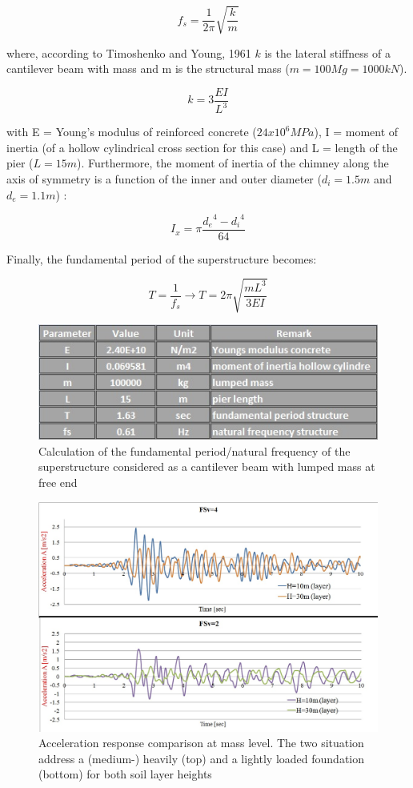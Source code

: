 \begin{equation}
	f_s=\frac{1}{2 \pi} \sqrt{\frac{k}{m}}
\end{equation}

where, according to Timoshenko and Young, 1961 $k$ is the lateral stiffness of a cantilever beam with mass and m is the structural mass ($m=100 Mg=1000 kN$).

\begin{equation}
	k=3\frac{EI}{L^3}
\end{equation}

with E = Young's modulus of reinforced concrete ($24x10^6 MPa$), I = moment of inertia (of a hollow cylindrical cross section for this case) and L = length of the pier ($L=15m$). Furthermore, the moment of inertia of the chimney along the axis of symmetry is a function of the inner and outer diameter ($d_i=1.5m$ and $d_e=1.1m$) :
 
\begin{equation}
	I_x=\pi \frac{{d_e}^4-{d_i}^4}{64}
\end{equation}

Finally, the fundamental period of the superstructure becomes:

\begin{equation}
	T=\frac{1}{f_s} \longrightarrow T=2 \pi \sqrt{\frac{mL^3}{3EI}}
\end{equation}

\begin{figure}[h]
	\centering
	\includegraphics[width=0.7 \linewidth]{"fundamental"}
	\caption{Calculation of the fundamental period/natural frequency of the superstructure considered as a cantilever beam with lumped mass at free end}
	\label{fundam}
\end{figure}

 \begin{figure}[h]
 	\centering
 	\includegraphics[width=0.7 \linewidth]{"acc_10m"}
 	\caption{Acceleration response comparison at mass level. The two situation address a (medium-) heavily (top) and a lightly loaded foundation (bottom) for both soil layer heights}
 	\label{10}
 \end{figure}

